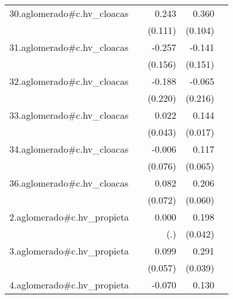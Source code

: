 {\begin{longtable}{l*{4}{D{.}{.}{-1}}}
\addlinespace
30.aglomerado#c.hv\_cloacas&                     &       0.243\sym{*}  &       0.360\sym{***}&                     \\
            &                     &     (0.111)         &     (0.104)         &                     \\
\addlinespace
31.aglomerado#c.hv\_cloacas&                     &      -0.257         &      -0.141         &                     \\
            &                     &     (0.156)         &     (0.151)         &                     \\
\addlinespace
32.aglomerado#c.hv\_cloacas&                     &      -0.188         &      -0.065         &                     \\
            &                     &     (0.220)         &     (0.216)         &                     \\
\addlinespace
33.aglomerado#c.hv\_cloacas&                     &       0.022         &       0.144\sym{***}&                     \\
            &                     &     (0.043)         &     (0.017)         &                     \\
\addlinespace
34.aglomerado#c.hv\_cloacas&                     &      -0.006         &       0.117         &                     \\
            &                     &     (0.076)         &     (0.065)         &                     \\
\addlinespace
36.aglomerado#c.hv\_cloacas&                     &       0.082         &       0.206\sym{***}&                     \\
            &                     &     (0.072)         &     (0.060)         &                     \\
\addlinespace
2.aglomerado#c.hv\_propieta&                     &       0.000         &       0.198\sym{***}&                     \\
            &                     &         (.)         &     (0.042)         &                     \\
\addlinespace
3.aglomerado#c.hv\_propieta&                     &       0.099         &       0.291\sym{***}&                     \\
            &                     &     (0.057)         &     (0.039)         &                     \\
\addlinespace
4.aglomerado#c.hv\_propieta&                     &      -0.070         &       0.130\sym{***}&                     \\

\end{longtable}}
